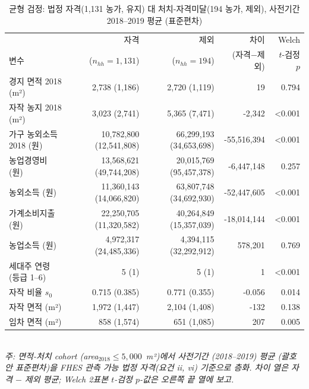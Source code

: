 \begin{table}[ht]
\centering
\caption{균형 검정: 법정 자격(1,131 농가, 유지) 대 처치-자격미달(194 농가, 제외), 사전기간 2018--2019 평균 (표준편차)}
\label{tab:dropped-balance-ko}
\small
\begin{tabular}{lrrrr}
\toprule
 & 자격 & 제외 & 차이 & Welch \\
변수 & ($n_{hh}=1{,}131$) & ($n_{hh}=194$) & (자격$-$제외) & $t$-검정 $p$ \\
\midrule
경지 면적 2018 (m²) & 2,738 (1,186) & 2,720 (1,119) & 19 & 0.794 \\
자작 농지 2018 (m²) & 3,023 (2,741) & 5,365 (7,471) & -2,342 & <0.001 \\
가구 농외소득 2018 (원) & 10,782,800 (12,541,808) & 66,299,193 (34,653,698) & -55,516,394 & <0.001 \\
농업경영비 (원) & 13,568,621 (49,744,208) & 20,015,769 (95,457,378) & -6,447,148 & 0.257 \\
농외소득 (원) & 11,360,143 (14,066,820) & 63,807,748 (34,692,930) & -52,447,605 & <0.001 \\
가계소비지출 (원) & 22,250,705 (11,320,582) & 40,264,849 (15,357,039) & -18,014,144 & <0.001 \\
농업소득 (원) & 4,972,317 (24,485,336) & 4,394,115 (32,292,912) & 578,201 & 0.769 \\
세대주 연령 (등급 1--6) & 5 (1) & 5 (1) & 1 & <0.001 \\
자작 비율 $s_0$ & 0.715 (0.385) & 0.771 (0.355) & -0.056 & 0.014 \\
자작 면적 (m²) & 1,972 (1,447) & 2,104 (1,408) & -132 & 0.138 \\
임차 면적 (m²) & 858 (1,574) & 651 (1,085) & 207 & 0.005 \\
\bottomrule
\end{tabular}
\\
\footnotesize\textit{주: 면적-처치 cohort (area$_{2018}\le 5{,}000$~m²)에서 사전기간 (2018--2019) 평균 (괄호 안 표준편차)을 FHES 관측 가능 법정 자격(요건 ii, vi) 기준으로 층화. 차이 열은 자격 $-$ 제외 평균; Welch 2표본 $t$-검정 $p$-값은 오른쪽 끝 열에 보고.}
\end{table}

